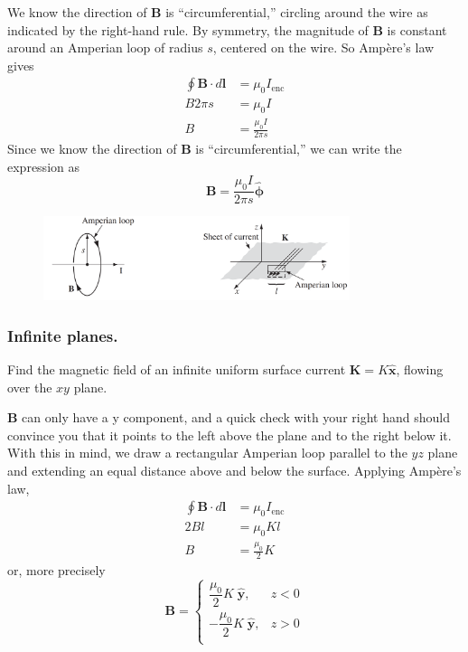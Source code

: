 \documentclass[../../../main.tex]{subfiles}
\begin{document}
We know the direction of \textbf{B} is “circumferential,” circling around the wire as indicated by the right-hand rule. By symmetry, the magnitude of \textbf{B} is constant around an Amperian loop of radius $s$, centered on the wire. So Ampère’s law gives
\begin{align*}
    \oint \mathbf{B}\cdot d\mathbf{l}&=\mu_0I_{\text{enc}}\\
    B2\pi s&=\mu_0I\\
    B&=\frac{\mu_0I}{2\pi s}
\end{align*}
Since we know the direction of \textbf{B} is “circumferential,” we can write the expression as 
\begin{equation*}
    \mathbf{B}=\frac{\mu_0I}{2\pi s}\boldsymbol{\hat{\phi}}
\end{equation*}
\begin{figure}[ht]
    \centering
    \includegraphics[width=0.8\textwidth]{../Rss/Electromagnetism/Magnetostatics/Ampere-1.png}
\end{figure}

\subsubsection*{Inﬁnite planes.} Find the magnetic ﬁeld of an inﬁnite uniform surface current 
$\mathbf{K} = K \mathbf{\hat{x}}$, ﬂowing over the $xy$ plane. 

\textbf{B} can only have a y component, and a quick check with your right hand should convince you that it points to the left above the plane and to the right below it. With this in mind, we draw a rectangular Amperian loop parallel to the $yz$ plane and extending an equal distance above and below the 
surface. Applying Ampère’s law,
\begin{align*}
    \oint \mathbf{B}\cdot d\mathbf{l}&=\mu_0I_{\text{enc}}\\
    2Bl&=\mu_0Kl\\
    B&=\frac{\mu_0}{2}K
\end{align*}
or, more precisely
\begin{equation*}
    \mathbf{B}=
    \begin{cases}
        \dfrac{\mu_0}{2}K\;\mathbf{\hat{y}},&z<0\\
        -\dfrac{\mu_0}{2}K\;\mathbf{\hat{y}},&z>0\\
    \end{cases}
\end{equation*}
\end{document}
